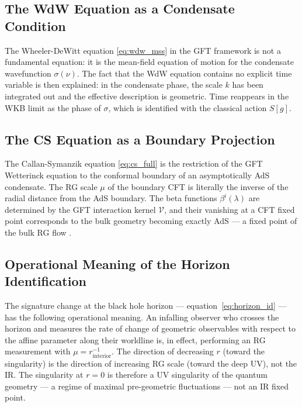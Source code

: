 \documentclass[12pt,a4paper]{article}
\begin{document}
\subsection{The WdW Equation as a Condensate Condition}

The Wheeler-DeWitt equation \eqref{eq:wdw_mss} in the GFT framework is
not a fundamental equation: it is the mean-field equation of motion
for the condensate wavefunction $\sigma(\nu)$.
The fact that the WdW equation contains no explicit time variable is
then explained: in the condensate phase, the scale $k$ has been
integrated out and the effective description is geometric.
Time reappears in the WKB limit as the phase of $\sigma$,
which is identified with the classical action $S[g]$.

\subsection{The CS Equation as a Boundary Projection}

The Callan-Symanzik equation \eqref{eq:cs_full} is the restriction of
the GFT Wetterinck equation to the conformal boundary of an
asymptotically AdS condensate.
The RG scale $\mu$ of the boundary CFT is literally the inverse of the
radial distance from the AdS boundary.
The beta functions $\beta^i(\lambda)$ are determined by the GFT
interaction kernel $\mathcal{V}$, and their vanishing at a CFT fixed
point corresponds to the bulk geometry becoming exactly AdS — a
fixed point of the bulk RG flow \cite{skenderis2002,witten1998}.

\subsection{Operational Meaning of the Horizon Identification}

The signature change at the black hole horizon —
equation~\eqref{eq:horizon_id} — has the following operational meaning.
An infalling observer who crosses the horizon and measures the rate of
change of geometric observables with respect to the affine parameter
along their worldline is, in effect, performing an RG measurement with
$\mu = r_{\mathrm{interior}}^{-1}$.
The direction of decreasing $r$ (toward the singularity) is the
direction of increasing RG scale (toward the deep UV), not the IR.
The singularity at $r = 0$ is therefore a UV singularity of the
quantum geometry — a regime of maximal pre-geometric fluctuations —
not an IR fixed point.

\end{document}
